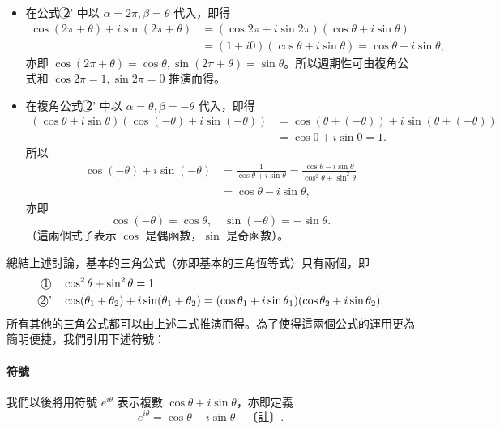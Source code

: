 \begin{example}
\begin{itemize}
  \item[(i)] 在公式 \textcircled{2}' 中以 $\alpha=2\pi, \beta=\theta$ 代入，即得
  \begin{align*}
  \cos(2\pi+\theta)+i\sin(2\pi+\theta) &= (\cos 2\pi+i\sin 2\pi)(\cos\theta+i\sin\theta) \\
  &= (1+i0)(\cos\theta+i\sin\theta) = \cos\theta+i\sin\theta,
  \end{align*}
  亦即 $\cos(2\pi+\theta)=\cos\theta, \sin(2\pi+\theta)=\sin\theta$。所以週期性可由複角公式和 $\cos 2\pi=1, \sin 2\pi=0$ 推演而得。
  \item[(ii)] 在複角公式 \textcircled{2}' 中以 $\alpha=\theta, \beta=-\theta$ 代入，即得
  \begin{align*}
  (\cos\theta+i\sin\theta)(\cos(-\theta)+i\sin(-\theta)) &= \cos(\theta+(-\theta))+i\sin(\theta+(-\theta)) \\
  &= \cos 0+i\sin 0 = 1.
  \end{align*}
  所以
  \begin{align*}
  \cos(-\theta)+i\sin(-\theta) &= \frac{1}{\cos\theta+i\sin\theta} = \frac{\cos\theta-i\sin\theta}{\cos^2\theta+\sin^2\theta} \\
  &= \cos\theta-i\sin\theta,
  \end{align*}
  亦即
  \[
  \cos(-\theta) = \cos\theta, \quad \sin(-\theta) = -\sin\theta.
  \]
  （這兩個式子表示 $\cos$ 是偶函數，$\sin$ 是奇函數）。 \qedhere
\end{itemize}
\end{example}

總結上述討論，基本的三角公式（亦即基本的三角恆等式）只有兩個，即
\begin{align*}
\text{\textcircled{1}} &\quad \cos^2\theta+\sin^2\theta = 1 \\
\text{\textcircled{2}'} &\quad \cos(\theta_1+\theta_2)+i\sin(\theta_1+\theta_2) = (\cos\theta_1+i\sin\theta_1)(\cos\theta_2+i\sin\theta_2).
\end{align*}
所有其他的三角公式都可以由上述二式推演而得。為了使得這兩個公式的運用更為簡明便捷，我們引用下述符號：

\paragraph{符號} 我們以後將用符號 $e^{i\theta}$ 表示複數 $\cos\theta+i\sin\theta$，亦即定義\footnotemark
\[
e^{i\theta} = \cos\theta+i\sin\theta \quad \text{〔註〕}.
\]

